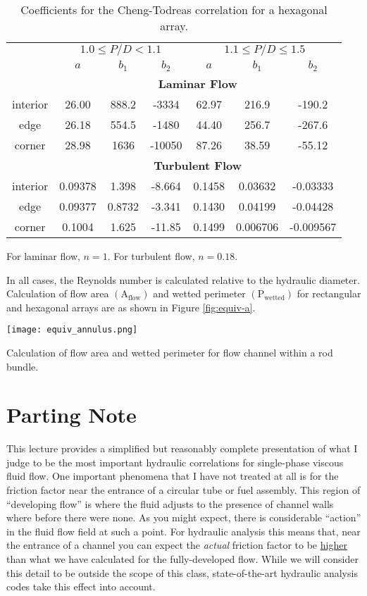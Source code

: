\begin{table}
\begin{tabular}{c c c c c c c}
\toprule
  & \multicolumn{3}{c}{$1.0 \le P/D < 1.1$} & \multicolumn{3}{c}{$1.1 \le P/D \le 1.5$} \\
  \cmidrule(lr){2-4} \cmidrule(lr){5-7}
 & $a$ & $b_1$ & $b_2$ & $a$ & $b_1$ & $b_2$ \\
  & \multicolumn{6}{c}{\textbf{Laminar Flow}} \\
interior  & 26.00 & 888.2 & -3334 & 62.97 & 216.9 & -190.2 \\
edge      & 26.18 & 554.5 & -1480 & 44.40 & 256.7 & -267.6 \\
corner    & 28.98 & 1636 & -10050 & 87.26 & 38.59 & -55.12 \\
& \multicolumn{6}{c}{\textbf{Turbulent Flow}} \\
interior & 0.09378 & 1.398 & -8.664 & 0.1458 & 0.03632 & -0.03333 \\
edge     & 0.09377 & 0.8732 & -3.341 & 0.1430 & 0.04199 & -0.04428 \\
corner   & 0.1004 & 1.625 & -11.85 & 0.1499 & 0.006706 & -0.009567 \\
\bottomrule
\end{tabular}
\caption{Coefficients for the Cheng-Todreas correlation for a hexagonal array.}
\label{tab:cheng-todreas-hex}
\end{table}
For laminar flow, $n=1$.  For turbulent flow, $n=0.18$.

In all cases, the Reynolds number is calculated relative to the hydraulic diameter.  Calculation of flow area $(\text{A}_{\text{flow}})$ and wetted perimeter $(\text{P}_{\text{wetted}})$ for rectangular and hexagonal arrays are as shown in Figure \ref{fig:equiv-a}.
\begin{marginfigure}
\texttt{[image: equiv\_annulus.png]}
\caption{Calculation of flow area and wetted perimeter for flow channel within a rod bundle.}
\label{fig:equiv-a}
\end{marginfigure}  

\section{Parting Note}
This lecture provides a simplified but reasonably complete presentation of what I judge to be the most important hydraulic correlations for single-phase viscous fluid flow.  One important phenomena that I have not treated at all is for the friction factor near the entrance of a circular tube or fuel assembly.  This region of ``developing flow'' is where the fluid adjusts to the presence of channel walls where before there were none.  As you might expect, there is considerable ``action'' in the fluid flow field at such a point.  For hydraulic analysis this means that, near the entrance of a channel you can expect the \emph{actual} friction factor to be \underline{higher} than what we have calculated for the fully-developed flow.  While we will consider this detail to be outside the scope of this class, state-of-the-art hydraulic analysis codes take this effect into account.

